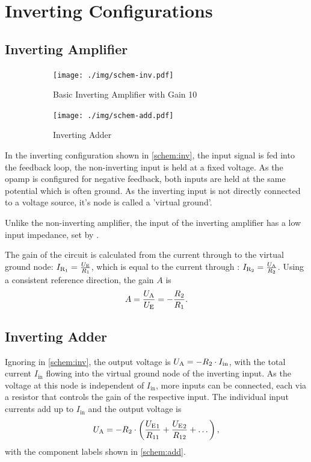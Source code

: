 \chapter{Inverting Configurations}
\section{Inverting Amplifier}

\begin{figure}
	\centering
	\begin{subfigure}{0.4\textwidth}
		\centering
		\texttt{[image: ./img/schem-inv.pdf]}
		\caption{Basic Inverting Amplifier with Gain 10}
		\label{schem:inv}
	\end{subfigure}
	\begin{subfigure}{0.4\textwidth}
		\centering
		\texttt{[image: ./img/schem-add.pdf]}
		\caption{Inverting Adder}
		\label{schem:add}
	\end{subfigure}
	\caption{}
\end{figure}

In the inverting configuration shown in \autoref{schem:inv}, the input signal is fed into the feedback loop, the non-inverting input is held at a fixed voltage.
As the opamp is configured for negative feedback, both inputs are held at the same potential which is often ground.
As the inverting input is not directly connected to a voltage source, it's node is called a 'virtual ground'.

Unlike the non-inverting amplifier, the input of the inverting amplifier has a low input impedance, set by .

The gain of the circuit is calculated from the current through  to the virtual ground node: $I_{\mathrm{R_1}} = \frac{U_\text{E}}{R_1}$, which is equal to the current through : $I_{\mathrm{R_2}} = \frac{U_\text{A}}{R_2}$.
Using a consistent reference direction, the gain  $A$ is \[A = \frac{U_\text{A}}{U_\text{E}} = -\frac{R_2}{R_1}.\]

\section{Inverting Adder}

Ignoring  in \autoref{schem:inv}, the output voltage \ua is $U_\text{A} = -R_2 \cdot I_\text{in}$, with the total current $I_\text{in}$ flowing into the virtual ground node of the inverting input.
As the voltage at this node is independent of $I_\text{in}$, more inputs can be connected, each via a resistor that controls the gain of the respective input.
The individual input currents add up to $I_\text{in}$ and the output voltage is \[U_\text{A} = -R_2 \cdot \left(\frac{{U_\text{E}}_1}{R_{11}} + \frac{{U_\text{E}}_2}{R_{12}} + \dots\right),\] with the component labels shown in \autoref{schem:add}.

